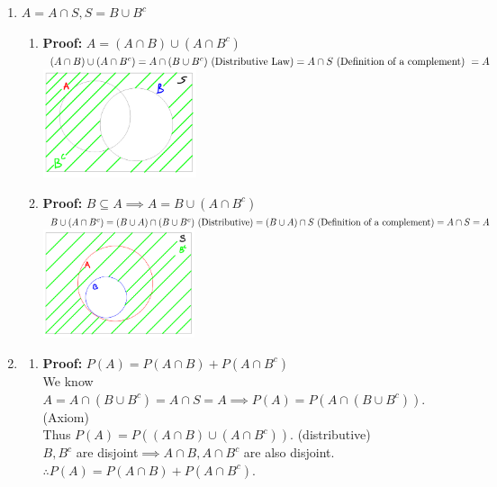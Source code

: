 \documentclass{article}
\title{\MakeUppercase{\jobname}}
\author{Justin Nguyen}
\date{\today}
\newcommand{\proof}[1]{\textbf{Proof: #1}}
\begin{document}
\maketitle
\begin{enumerate}
    \item $A = A \cap S, S = B\cup B^c$
    \begin{enumerate}
      \item \proof{}$A = (A\cap B) \cup (A \cap B^c)$\\
      $(A\cap B) \cup (A\cap B^c)\\
      = A\cap (B\cup B^c) \text{ (Distributive Law)}\\
      = A\cap S \text{ (Definition of a complement) }\\
      = A$\\
      \includegraphics*[height=1.25in]{VD1A.png}
      \item \proof{} $B\subseteq A \implies A = B\cup (A\cap B^c)$\\
      $B\cup (A\cap B^c)\\
      = (B\cup A)\cap(B\cup B^c) \text{ (Distributive)}\\
      = (B\cup A) \cap S \text{ (Definition of a complement)}\\
      = A \cap S\\ 
      = A$\\
      \includegraphics*[height=1.25in]{VD1B.png}
    \end{enumerate}
    \item \begin{enumerate}
      \item \proof{}${P(A) = P(A\cap B) + P(A\cap B^c)}$\\
      We know $A = A \cap (B\cup B^c) = A\cap S = A \implies P(A) = P(A\cap (B\cup B^c))$. (Axiom)\\
      Thus $P(A) = P((A \cap B) \cup (A \cap B^c))$. (distributive)\\
      $B, B^c$ are disjoint$\implies A\cap B, A\cap B^c$ are also disjoint.\\
      $\therefore P(A) = P(A\cap B) + P(A\cap B^c)$.


\end{enumerate}
\end{enumerate}
\end{document}

